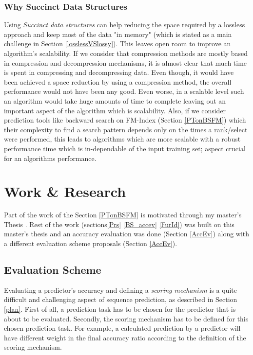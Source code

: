 \subsubsection{Why Succinct Data Structures}
Using \emph{Succinct data structures} can help reducing the space required by a lossless approach and keep most of the data "in memory" (which is stated as a main challenge in Section \ref{losslessVSlossy}). This leaves open room to improve an algorithm's scalability. If we consider that compression methods are mostly based in compression and decompression mechanisms, it is almost clear that much time is spent in compressing and decompressing data. Even though, it would have been achieved a space reduction by using a compression method, the overall performance would not have been any good. Even worse, in a scalable level such an algorithm would take huge amounts of time to complete leaving out an important aspect of the algorithm which is scalability. Also, if we consider prediction tools like backward search on FM-Index (Section \ref{PTonBSFM}) which their complexity to find a search pattern depends only on the times a rank/select were performed, this leads to algorithms which are more scalable with a robust performance time which is in-dependable of the input training set; aspect crucial for an algorithms performance.


\section{Work \& Research}
Part of the work of the Section \ref{PTonBSFM} is motivated through my master's Thesis \cite{ktistakis}. Rest of the work (sections\ref{Prs} \ref{BS_accev} \ref{FurId}) was built on this master's thesis and an accuracy evaluation was done (Section \ref{AccEv}) along with a different evaluation scheme proposals (Section \ref{AccEv}).

\subsection{Evaluation Scheme}{\label{EvSch}}
Evaluating a predictor's accuracy and defining a \emph{scoring mechanism} is a quite difficult and challenging aspect of sequence prediction, as described in Section \ref{plan}. First of all, a prediction task has to be chosen for the predictor that is about to be evaluated. Secondly, the scoring mechanism has to be defined for this chosen prediction task. For example, a calculated prediction by a predictor will have different weight in the final accuracy ratio according to the definition of the scoring mechanism.
